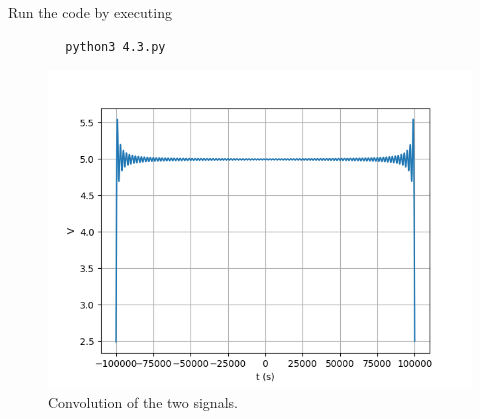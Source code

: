 \documentclass[journal,12pt,twocolumn]{IEEEtran}
\numberwithin{equation}{section}
\numberwithin{figure}{section}
\renewcommand\thesection{\arabic{section}}
\begin{document}
\begin{enumerate}[label=\thesection.\arabic*
,ref=\thesection.\theenumi]
	Run the code by executing
	\begin{lstlisting}
		python3 4.3.py
	\end{lstlisting}
\begin{figure}[!ht]
    \includegraphics[width=\columnwidth]{FIGURES/4.3.png}
    \caption{Convolution of the two signals.}
    \label{eq:fig-4.3}
\end{figure}

\end{enumerate}
\end{document}
